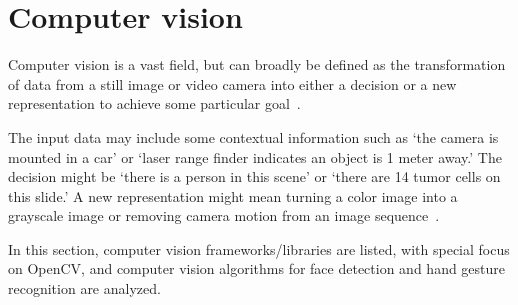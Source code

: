 %
\section{Computer vision}
\label{sec:computer-vision}
Computer vision is a vast field, but can broadly be defined as the
transformation of data from a still image or video camera into
either a decision or a new representation to achieve some particular goal~\cite{kaehler2016learning}.

The input data may include some contextual information
such as `the camera is mounted in a car' or `laser range finder indicates an
object is 1 meter away.'
The decision might be `there is a person in this scene' or `there are 14
tumor cells on this slide.'
A new representation might mean turning a color image
into a grayscale image or removing camera motion from an image
sequence~\cite{kaehler2016learning}.

In this section, computer vision frameworks/libraries are listed, with special
focus on OpenCV, and computer vision algorithms for face detection and hand
gesture recognition are analyzed.
%

